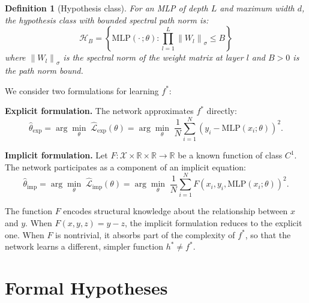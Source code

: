 \documentclass[12pt]{article}
\newtheorem{definition}[theorem]{Definition}
\newcommand{\R}{\mathbb{R}}
\newcommand{\MLP}{\mathrm{MLP}}
\newcommand{\norm}[1]{\left\|#1\right\|}
\begin{document}
\begin{definition}[Hypothesis class]
\label{def:hypothesis}
For an MLP of depth $L$ and maximum width $d$, the hypothesis class
with bounded spectral path norm is:
\begin{equation}
  \mathcal{H}_B = \left\{ \MLP(\cdot\,;\theta) :
    \prod_{l=1}^{L} \norm{W_l}_\sigma \le B \right\}
\end{equation}
where $\norm{W_l}_\sigma$ is the spectral norm of the weight matrix
at layer $l$ and $B > 0$ is the path norm bound.
\end{definition}

We consider two formulations for learning $f^*$:

\textbf{Explicit formulation.}
The network approximates $f^*$ directly:
\begin{equation}
  \hat{\theta}_{\mathrm{exp}} = \arg\min_\theta \;
  \hat{\mathcal{L}}_{\mathrm{exp}}(\theta)
  = \arg\min_\theta \;
  \frac{1}{N}\sum_{i=1}^{N}(y_i - \MLP(x_i;\theta))^2.
  \label{eq:loss_exp}
\end{equation}

\textbf{Implicit formulation.}
Let $F: \mathcal{X} \times \R \times \R \to \R$ be a known function
of class $C^1$.
The network participates as a component of an implicit equation:
\begin{equation}
  \hat{\theta}_{\mathrm{imp}} = \arg\min_\theta \;
  \hat{\mathcal{L}}_{\mathrm{imp}}(\theta)
  = \arg\min_\theta \;
  \frac{1}{N}\sum_{i=1}^{N} F(x_i, y_i, \MLP(x_i;\theta))^2.
  \label{eq:loss_imp}
\end{equation}

The function $F$ encodes structural knowledge about the relationship
between $x$ and $y$.
When $F(x,y,z) = y - z$, the implicit formulation reduces to the
explicit one.
When $F$ is nontrivial, it absorbs part of the complexity of $f^*$,
so that the network learns a different, simpler function
$h^* \ne f^*$.

\section{Formal Hypotheses}
\label{sec:hypotheses}
\end{document}
